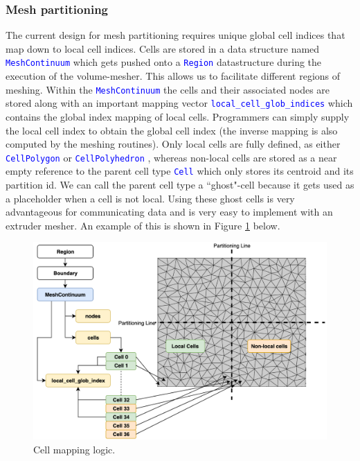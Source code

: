 \documentclass[11pt,letterpaper,titlepage]{article}
\newcommand{\xmltag}[1]{\textcolor{blue}{ \texttt{#1}} }
\numberwithin{equation}{section}
\begin{document}
\subsubsection{Mesh partitioning}
The current design for mesh partitioning requires unique global cell indices that map down to local cell indices. Cells are stored in a data structure named \xmltag{MeshContinuum} which gets pushed onto a \xmltag{Region} datastructure during the execution of the volume-mesher. This allows us to facilitate different regions of meshing. Within the \xmltag{MeshContinuum} the cells and their associated nodes are stored along with an important mapping vector \xmltag{local\_cell\_glob\_indices} which contains the global index mapping of local cells. Programmers can simply supply the local cell index to obtain the global cell index (the inverse mapping is also computed by the meshing routines).
\newline
\newline
Only local cells are fully defined, as either \xmltag{CellPolygon} or \xmltag{CellPolyhedron}, whereas non-local cells are stored as a near empty reference to the parent cell type \xmltag{Cell} which only stores its centroid and its partition id. We can call the parent cell type a ``ghost"-cell because it gets used as a placeholder when a cell is not local. Using these ghost cells is very advantageous for communicating data and is very easy to implement with an extruder mesher. An example of this is shown in Figure \ref{fig:cellmapping} below.


\begin{figure}[H]
\centering
\includegraphics[width=0.9\linewidth]{LatexDraw/CellMapping}
\caption{Cell mapping logic.}
\label{fig:cellmapping}
\end{figure}
\end{document}
